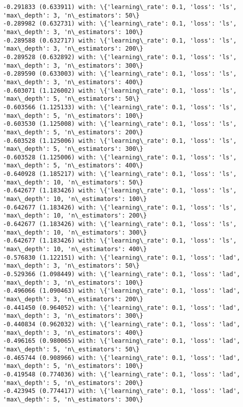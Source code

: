 \documentclass[11pt]{article}
\begin{document}
    \begin{Verbatim}[commandchars=\\\{\}]
-0.291833 (0.633911) with: \{'learning\_rate': 0.1, 'loss': 'ls', 'max\_depth': 3, 'n\_estimators': 50\}
-0.289982 (0.632731) with: \{'learning\_rate': 0.1, 'loss': 'ls', 'max\_depth': 3, 'n\_estimators': 100\}
-0.289588 (0.632717) with: \{'learning\_rate': 0.1, 'loss': 'ls', 'max\_depth': 3, 'n\_estimators': 200\}
-0.289528 (0.632892) with: \{'learning\_rate': 0.1, 'loss': 'ls', 'max\_depth': 3, 'n\_estimators': 300\}
-0.289590 (0.633003) with: \{'learning\_rate': 0.1, 'loss': 'ls', 'max\_depth': 3, 'n\_estimators': 400\}
-0.603071 (1.126002) with: \{'learning\_rate': 0.1, 'loss': 'ls', 'max\_depth': 5, 'n\_estimators': 50\}
-0.603566 (1.125133) with: \{'learning\_rate': 0.1, 'loss': 'ls', 'max\_depth': 5, 'n\_estimators': 100\}
-0.603530 (1.125008) with: \{'learning\_rate': 0.1, 'loss': 'ls', 'max\_depth': 5, 'n\_estimators': 200\}
-0.603528 (1.125006) with: \{'learning\_rate': 0.1, 'loss': 'ls', 'max\_depth': 5, 'n\_estimators': 300\}
-0.603528 (1.125006) with: \{'learning\_rate': 0.1, 'loss': 'ls', 'max\_depth': 5, 'n\_estimators': 400\}
-0.640928 (1.185217) with: \{'learning\_rate': 0.1, 'loss': 'ls', 'max\_depth': 10, 'n\_estimators': 50\}
-0.642677 (1.183426) with: \{'learning\_rate': 0.1, 'loss': 'ls', 'max\_depth': 10, 'n\_estimators': 100\}
-0.642677 (1.183426) with: \{'learning\_rate': 0.1, 'loss': 'ls', 'max\_depth': 10, 'n\_estimators': 200\}
-0.642677 (1.183426) with: \{'learning\_rate': 0.1, 'loss': 'ls', 'max\_depth': 10, 'n\_estimators': 300\}
-0.642677 (1.183426) with: \{'learning\_rate': 0.1, 'loss': 'ls', 'max\_depth': 10, 'n\_estimators': 400\}
-0.576830 (1.122151) with: \{'learning\_rate': 0.1, 'loss': 'lad', 'max\_depth': 3, 'n\_estimators': 50\}
-0.529366 (1.098449) with: \{'learning\_rate': 0.1, 'loss': 'lad', 'max\_depth': 3, 'n\_estimators': 100\}
-0.496066 (1.090463) with: \{'learning\_rate': 0.1, 'loss': 'lad', 'max\_depth': 3, 'n\_estimators': 200\}
-0.441450 (0.964052) with: \{'learning\_rate': 0.1, 'loss': 'lad', 'max\_depth': 3, 'n\_estimators': 300\}
-0.440834 (0.962032) with: \{'learning\_rate': 0.1, 'loss': 'lad', 'max\_depth': 3, 'n\_estimators': 400\}
-0.496165 (0.980065) with: \{'learning\_rate': 0.1, 'loss': 'lad', 'max\_depth': 5, 'n\_estimators': 50\}
-0.465744 (0.908966) with: \{'learning\_rate': 0.1, 'loss': 'lad', 'max\_depth': 5, 'n\_estimators': 100\}
-0.419548 (0.774036) with: \{'learning\_rate': 0.1, 'loss': 'lad', 'max\_depth': 5, 'n\_estimators': 200\}
-0.423945 (0.774417) with: \{'learning\_rate': 0.1, 'loss': 'lad', 'max\_depth': 5, 'n\_estimators': 300\}

\end{Verbatim}
\end{document}
